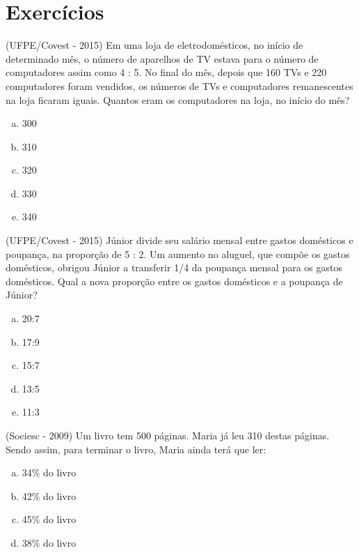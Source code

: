 
\section{Exercícios}

\begin{exer}
(UFPE/Covest - 2015) Em uma loja de eletrodomésticos, no início de determinado mês, o número de aparelhos de TV estava para o número de computadores assim como 4 : 5. No final do mês, depois que 160 TVs e 220 computadores foram vendidos, os números de TVs e computadores remanescentes na loja ficaram iguais. Quantos eram os computadores na loja, no início do mês?
  \begin{enumerate}[a)]
  \item 300
  \item 310
  \item 320
  \item 330
  \item 340
  \end{enumerate}
 \end{exer}
 
 \begin{exer}
 (UFPE/Covest - 2015) Júnior divide seu salário mensal entre gastos domésticos e poupança, na proporção de 5 : 2. Um aumento no aluguel, que compõe os gastos domésticos, obrigou Júnior a transferir 1/4 da poupança mensal para os gastos domésticos. Qual a nova proporção entre os gastos domésticos e a poupança de Júnior?
  \begin{enumerate}[a)]
  \item 20:7
  \item 17:9
  \item 15:7
  \item 13:5
  \item 11:3
  \end{enumerate}
 \end{exer}
 
 \begin{exer}
 (Sociesc - 2009) Um livro tem 500 páginas. Maria já leu 310 destas páginas. Sendo assim, para terminar o livro, Maria ainda terá que ler:
  \begin{enumerate}[a)]
  \item 34\% do livro
  \item 42\% do livro
  \item 45\% do livro
  \item 38\% do livro
 \end{enumerate}
 \end{exer}
 
